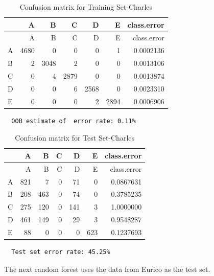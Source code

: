 \documentclass[12pt,twoside]{reedthesis}
\begin{document}
  \begin{longtable}[c]{@{}lrrrrrr@{}}
  \caption{Confusion matrix for Training Set-Charles}\tabularnewline
  \toprule
  & A & B & C & D & E & class.error\tabularnewline
  \midrule
  \endfirsthead
  \toprule
  & A & B & C & D & E & class.error\tabularnewline
  \midrule
  \endhead
  A & 4680 & 0 & 0 & 0 & 1 & 0.0002136\tabularnewline
  B & 2 & 3048 & 2 & 0 & 0 & 0.0013106\tabularnewline
  C & 0 & 4 & 2879 & 0 & 0 & 0.0013874\tabularnewline
  D & 0 & 0 & 6 & 2568 & 0 & 0.0023310\tabularnewline
  E & 0 & 0 & 0 & 2 & 2894 & 0.0006906\tabularnewline
  \bottomrule
  \end{longtable}
  
  \begin{verbatim}
  OOB estimate of  error rate: 0.11%
  \end{verbatim}
  
  \newpage
  
  \begin{longtable}[c]{@{}lrrrrrr@{}}
  \caption{Confusion matrix for Test Set-Charles}\tabularnewline
  \toprule
  & A & B & C & D & E & class.error\tabularnewline
  \midrule
  \endfirsthead
  \toprule
  & A & B & C & D & E & class.error\tabularnewline
  \midrule
  \endhead
  A & 821 & 7 & 0 & 71 & 0 & 0.0867631\tabularnewline
  B & 208 & 463 & 0 & 74 & 0 & 0.3785235\tabularnewline
  C & 275 & 120 & 0 & 141 & 3 & 1.0000000\tabularnewline
  D & 461 & 149 & 0 & 29 & 3 & 0.9548287\tabularnewline
  E & 88 & 0 & 0 & 0 & 623 & 0.1237693\tabularnewline
  \bottomrule
  \end{longtable}
  
  \begin{verbatim}
  Test set error rate: 45.25%
  \end{verbatim}
  
  The next random forest uses the data from Eurico as the test set.
  
  \begin{Shaded}
  \begin{Highlighting}[]
  \NormalTok{(}\NormalTok{)}
  
  \StringTok{ }\NormalTok{wl2[wl2$user_name ==}\StringTok{ }\NormalTok{subjects[}\NormalTok{], ]}
  \StringTok{ }\NormalTok{wl2[wl2$user_name !=}\StringTok{ }\NormalTok{subjects[}\NormalTok{], ]}
  \StringTok{ }\NormalTok{(} \NormalTok{OtherSubs4[, }\NormalTok{:}\NormalTok{], } 
                                  \NormalTok{Sub4[, }\NormalTok{:}\NormalTok{], } 
                                  \NormalTok{)}
  \end{Highlighting}
  \end{Shaded}
  
\end{document}

